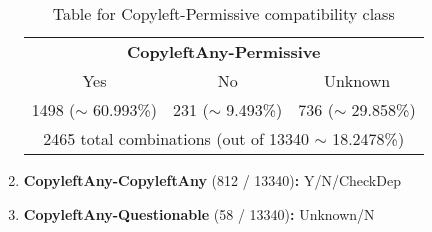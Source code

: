 \begin{enumerate}
	\begin{table}[h]
		\caption{Table for Copyleft-Permissive compatibility class}
		\label{tab:copyleft-permissive-table}
		\centering
		\begin{tabular}{|c|c|c|}
			\hline
			\multicolumn{3}{|c|}{\textbf{CopyleftAny-Permissive}} \\
			Yes & No & Unknown \\
			1498 ($\sim$ 60.993\%) & 231 ($\sim$ 9.493\%) & 736 ($\sim$ 29.858\%) \\\hline
			\multicolumn{3}{|c|}{2465 total combinations (out of 13340 $\sim$ 18.2478\%)} \\
			\hline
		\end{tabular}
	\end{table}
	
	\item \textbf{CopyleftAny-CopyleftAny} (812 / 13340)\textbf{:} Y/N/CheckDep
	
	\item \textbf{CopyleftAny-Questionable} (58 / 13340)\textbf{:} Unknown/N
\end{enumerate}